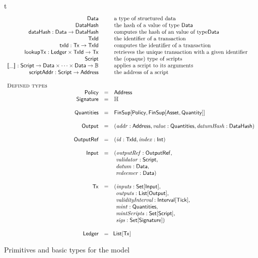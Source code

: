 \begin{ruledfigure}{t}
\begin{displaymath}
\begin{array}{rll}
      \Data && \mbox{a type of structured data}\\
      \DataHash && \mbox{the hash of a value of type \Data{}}\\
      \hashData : \Data \rightarrow \DataHash && \mbox{computes the hash of an value of type\Data}\\
      \TxId && \mbox{the identifier of a transaction}\\
      \txId : \eutxotx \rightarrow \TxId && \mbox{computes the identifier of a transaction}\\
      \lookupTx : \Ledger \times \TxId \rightarrow \eutxotx{} && \mbox{retrieves the unique transaction with a given identifier}\\
      \Script && \mbox{the (opaque) type of scripts}\\
      \applyScript{\_}: \Script \rightarrow \Data \times \cdots \times \Data \rightarrow \B && \mbox{applies a script to its arguments}\\
      \scriptAddr : \Script \rightarrow \Address && \mbox{the address of a script}\\
\\
    \multicolumn{3}{l}{\textsc{Defined types}}\\
    \Policy  &=& \Address\\
    \Signature &=& \H\\
    \\
    \Quantities   &=& \FinSup{\Policy}{\FinSup{\Asset}{\Quantity}}\\
    \\
    \Output &=&(\addr: \Address, \val: \Quantities, \datumHash: \DataHash)\\
    \\
    \OutputRef &= &(\txrefid: \TxId, \idx: \s{Int})\\
    \\
    \Input &=&( \outputref: \sf{OutputRef},\\
                & &\ \validator: \Script,\\
                & &\ \datum: \Data,\\
                & &\ \redeemer: \Data)\\
    \\
    \eutxotx &=&(\inputs: \Set{\Input},\\
               & &\ \outputs: \List{\Output},\\
               & &\ \i{validityInterval}: \Interval{\Tick},\\
               & &\ \mint: \Quantities,\\
               & &\ \mintScripts: \Set{\Script},\\
               & &\ \sigs: \Set{\Signature})\\
    \\
    \Ledger &=&\!\List{\eutxotx}\\
    \end{array}
  \end{displaymath}
  \caption{Primitives and basic types for the \EUTXOma{} model}
  \label{fig:eutxo-types}
\end{ruledfigure}
